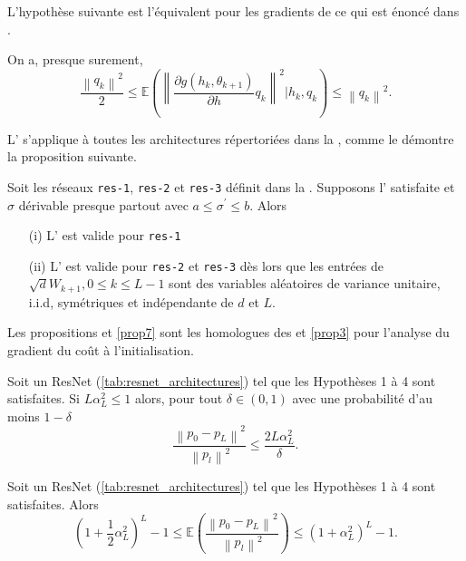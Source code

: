 L'hypothèse suivante est l'équivalent pour les gradients de ce qui est énoncé dans .
\begin{assumption}\label{H4}
    On a, presque surement, 
    \[
        \frac{\left\| q_k \right\| ^2}{2} \leq \mathbb{E}(\left\| \frac{\partial g(h_k, \theta _{k+1})}{\partial h} q_k  \right\| ^2 | h_k, q_k ) \leq \left\| q_k \right\| ^2
    .\]
\end{assumption}

L' s'applique à toutes les architectures répertoriées dans la , comme le démontre la proposition suivante.
\begin{proposition}\label{prop5}
    Soit les réseaux \texttt{res-1}, \texttt{res-2} et \texttt{res-3} définit dans la . Supposons l' satisfaite et $ \sigma  $ dérivable presque partout avec $ a \leq \sigma ^\prime \leq b $. Alors
    \begin{itemize}
        \item [(i)] L' est valide pour \texttt{res-1}
        \item [(ii)] L' est valide pour \texttt{res-2} et \texttt{res-3} dès lors que les entrées de $ \sqrt{d} W_{k+1}, 0 \leq k \leq L-1 $ sont des variables aléatoires de variance unitaire, i.i.d, symétriques et indépendante de $ d $ et $ L $.
    \end{itemize}
\end{proposition}

Les propositions  et \ref{prop7} sont les homologues des  et \ref{prop3} pour l'analyse du gradient du coût à l'initialisation.

\begin{proposition}\label{prop6}
    Soit un ResNet (\ref{tab:resnet_architectures}) tel que les Hypothèses 1 à 4 sont satisfaites. Si $ L \alpha _L ^2 \leq 1 $ alors, pour tout $ \delta \in (0,1) $ avec une probabilité d'au moins $ 1 - \delta  $ 
    \[
        \frac{\left\| p_0 - p_L \right\| ^2 }{\left\| p_l \right\| ^2 } \leq \frac{2 L \alpha _L ^2}{\delta }
    .\]
\end{proposition}

\begin{proposition}\label{prop7}
    Soit un ResNet (\ref{tab:resnet_architectures}) tel que les Hypothèses 1 à 4 sont satisfaites. Alors 
    \[
        (1 + \frac{1}{2} \alpha _L ^2)^L - 1 \leq \mathbb{E}( \frac{\left\| p_0 - p_L \right\| ^2 }{\left\| p_l \right\| ^2 } ) \leq (1 + \alpha _L ^2)^L - 1
    .\]
\end{proposition}


